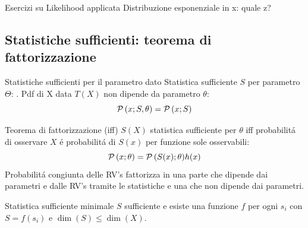 \documentclass[asd-beamer.tex]{subfiles}%
\begin{document}
\begin{frame}{Esercizi su Likelihood applicata}
Distribuzione esponenziale in x: quale z?
\end{frame}

\subsection{Statistiche sufficienti: teorema di fattorizzazione}

\begin{frame}{Statistiche sufficienti per il parametro dato}
Statistica sufficiente $S$ per parametro $\Theta$: . Pdf di X data $T(X)$ non dipende da parametro $\theta$:
\[\operatorname{\mathcal{P}}{(x;S,\theta)}=\operatorname{\mathcal{P}}{(x;S)}\]
\begin{block}{Teorema di fattorizzazione (iff)}
$S(X)$ statistica sufficiente per $\theta$ iff probabilit\'a di osservare $X$ \'e probabilit\'a di $S(x)$ per funzione sole osservabili: \[\operatorname{\mathcal{P}}{(x;\theta)}=\operatorname{\mathcal{P}}{(S(x);\theta)}h(x)\]
Probabilit\'a congiunta delle RV's fattorizza in una parte che dipende dai parametri e dalle RV's tramite le statistiche e una che non dipende dai parametri.
\end{block}
\begin{block}{Statistica sufficiente minimale}
$S$ sufficiente e esiste una funzione $f$ per ogni $s_i$ con $S=f(s_i)$ e $\dim({S})\leq\dim{(X)}$.
\end{block}
\end{frame}
\end{document}
